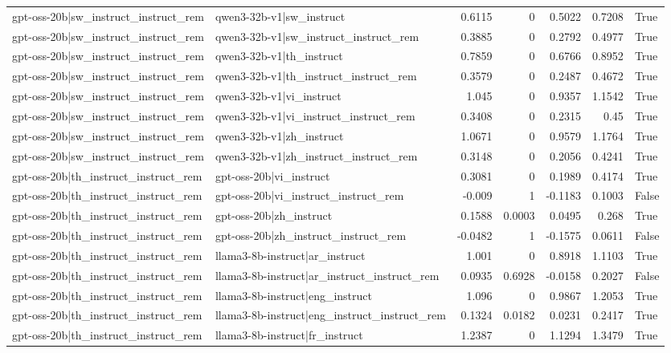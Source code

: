 \begin{table}
\begin{tabular}{l l r r r r l}
gpt-oss-20b|sw_instruct_instruct_rem & qwen3-32b-v1|sw_instruct & 0.6115 & 0 & 0.5022 & 0.7208 & True \\
gpt-oss-20b|sw_instruct_instruct_rem & qwen3-32b-v1|sw_instruct_instruct_rem & 0.3885 & 0 & 0.2792 & 0.4977 & True \\
gpt-oss-20b|sw_instruct_instruct_rem & qwen3-32b-v1|th_instruct & 0.7859 & 0 & 0.6766 & 0.8952 & True \\
gpt-oss-20b|sw_instruct_instruct_rem & qwen3-32b-v1|th_instruct_instruct_rem & 0.3579 & 0 & 0.2487 & 0.4672 & True \\
gpt-oss-20b|sw_instruct_instruct_rem & qwen3-32b-v1|vi_instruct & 1.045 & 0 & 0.9357 & 1.1542 & True \\
gpt-oss-20b|sw_instruct_instruct_rem & qwen3-32b-v1|vi_instruct_instruct_rem & 0.3408 & 0 & 0.2315 & 0.45 & True \\
gpt-oss-20b|sw_instruct_instruct_rem & qwen3-32b-v1|zh_instruct & 1.0671 & 0 & 0.9579 & 1.1764 & True \\
gpt-oss-20b|sw_instruct_instruct_rem & qwen3-32b-v1|zh_instruct_instruct_rem & 0.3148 & 0 & 0.2056 & 0.4241 & True \\
gpt-oss-20b|th_instruct_instruct_rem & gpt-oss-20b|vi_instruct & 0.3081 & 0 & 0.1989 & 0.4174 & True \\
gpt-oss-20b|th_instruct_instruct_rem & gpt-oss-20b|vi_instruct_instruct_rem & -0.009 & 1 & -0.1183 & 0.1003 & False \\
gpt-oss-20b|th_instruct_instruct_rem & gpt-oss-20b|zh_instruct & 0.1588 & 0.0003 & 0.0495 & 0.268 & True \\
gpt-oss-20b|th_instruct_instruct_rem & gpt-oss-20b|zh_instruct_instruct_rem & -0.0482 & 1 & -0.1575 & 0.0611 & False \\
gpt-oss-20b|th_instruct_instruct_rem & llama3-8b-instruct|ar_instruct & 1.001 & 0 & 0.8918 & 1.1103 & True \\
gpt-oss-20b|th_instruct_instruct_rem & llama3-8b-instruct|ar_instruct_instruct_rem & 0.0935 & 0.6928 & -0.0158 & 0.2027 & False \\
gpt-oss-20b|th_instruct_instruct_rem & llama3-8b-instruct|eng_instruct & 1.096 & 0 & 0.9867 & 1.2053 & True \\
gpt-oss-20b|th_instruct_instruct_rem & llama3-8b-instruct|eng_instruct_instruct_rem & 0.1324 & 0.0182 & 0.0231 & 0.2417 & True \\
gpt-oss-20b|th_instruct_instruct_rem & llama3-8b-instruct|fr_instruct & 1.2387 & 0 & 1.1294 & 1.3479 & True \\

\end{tabular}
\end{table}
